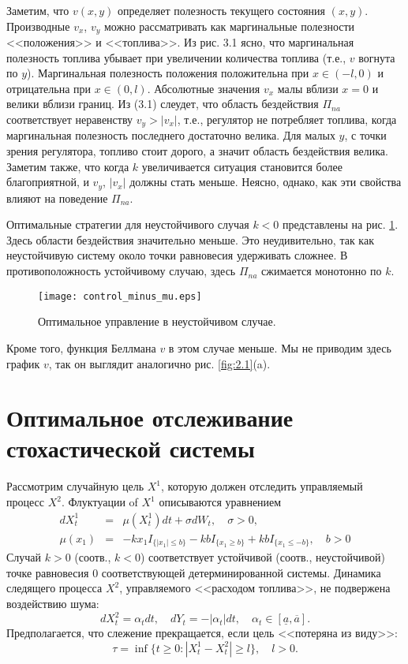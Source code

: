 Заметим, что $v(x,y)$ определяет полезность текущего состояния $(x,y)$. Производные $v_x$, $v_y$ можно рассматривать как маргинальные полезности <<положения>> и <<топлива>>. Из рис. 3.1 ясно, что маргинальная полезность топлива убывает при увеличении количества топлива (т.е., $v$ вогнута по $y$). Маргинальная полезность положения положительна при $x\in (-l,0)$ и отрицательна при $x\in (0,l)$. Абсолютные значения $v_x$ малы вблизи $x=0$ и велики вблизи границ. Из (3.1) слеудет, что область бездействия $\Pi_{na}$ соответствует неравенству $v_y>|v_x|$, т.е., регулятор не потребляет топлива, когда маргинальная полезность последнего достаточно велика. Для малых $y$, с точки зрения регулятора, топливо стоит дорого, а значит область бездействия велика. Заметим также, что когда $k$ увеличивается ситуация становится более благоприятной, и $v_y$, $|v_x|$ должны стать меньше. Неясно, однако, как эти свойства влияют на поведение $\Pi_{na}$.

Оптимальные стратегии для неустойчивого случая $k<0$  представлены на рис. \ref{fig:2.3}. Здесь области бездействия значительно меньше. Это неудивительно, так как неустойчивую систему около точки равновесия удерживать сложнее. В противоположность устойчивому случаю, здесь $\Pi_{na}$ сжимается монотонно по $k$.
\begin{figure}[ht!]
        \centering
         \texttt{[image: control\_minus\_mu.eps]}
        \caption{Оптимальное управление в неустойчивом случае.}
          \label{fig:2.3}
\end{figure}
Кроме того, функция Беллмана $v$ в этом случае меньше. Мы не приводим здесь график $v$, так он выглядит аналогично рис. \ref{fig:2.1}(a).

\section{Оптимальное отслеживание стохастической системы} \label{sec:2.4}
Рассмотрим случайную цель $X^1$, которую должен отследить управляемый процесс $X^2$. Флуктуации of $X^1$ описываются уравнением
\begin{eqnarray*}
dX^1_t &=& \mu(X^1_t) dt +\sigma dW_t,\quad \sigma>0,\\
\mu(x_1)&=& -k x_1 I_{\{|x_1|\le b\}} - k b I_{\{x_1\ge b\}}+k b I_{\{x_1\le -b\}},\quad b>0
\end{eqnarray*}
Случай $k>0$ (соотв., $k<0$) соответствует устойчивой (соотв., неустойчивой) точке равновесия $0$ соответствующей детерминированной системы. Динамика следящего процесса $X^2$, управляемого <<расходом топлива>>, не подвержена воздействию шума:
$$ dX^2_t =\alpha_t dt,\quad dY_t =-|\alpha_t|dt,\quad \alpha_t\in [\underline a,\overline a].$$
Предполагается, что слежение прекращается, если цель <<потеряна из виду>>:
$$\tau=\inf\{t\ge 0:|X^1_t- X^2_t|\ge l\},\quad l>0.$$

